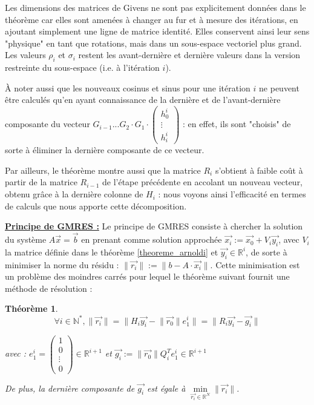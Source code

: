 \documentclass[11pt,a4paper,oneside]{memoir}
\newcommand{\R}{\mathbb{R}}	\newcommand{\Q}{\mathbb{Q}}	\newcommand{\C}{\mathbb{C}}
\newcommand{\N}{\mathbb{N}}	\newcommand{\Z}{\mathbb{Z}}
\theoremstyle{definition}
\theoremstyle{remark}
\theoremstyle{plain}
\newtheorem{theorem}{{Théorème}}
\begin{document}
Les dimensions des matrices de Givens ne sont pas explicitement données dans le théorème car elles sont amenées à changer au fur et à mesure des itérations, en ajoutant simplement une ligne de matrice identité. Elles conservent ainsi leur sens "physique" en tant que rotations, mais dans un sous-espace vectoriel plus grand. Les valeurs $\rho_i$ et $\sigma_i$ restent les avant-dernière et dernière valeurs dans la version restreinte du sous-espace (i.e. à l'itération $i$).

\`A noter aussi que les nouveaux cosinus et sinus pour une itération $i$ ne peuvent être calculés qu'en ayant connaissance de la dernière et de l'avant-dernière composante du vecteur $G_{i-1} ... G_2 \cdot G_1 \cdot \left( \begin{matrix}
h_0^i \\
\vdots \\
h_i^i
\end{matrix} \right)$ : en effet, ils sont "choisis" de sorte à éliminer la dernière composante de ce vecteur.

Par ailleurs, le théorème montre aussi que la matrice $R_i$ s'obtient à faible coût à partir de la matrice $R_{i-1}$ de l'étape précédente en accolant un nouveau vecteur, obtenu grâce à la dernière colonne de $H_i$ : nous voyons ainsi l'efficacité en termes de calculs que nous apporte cette décomposition.\bigskip

\underline{\textbf{Principe de GMRES :}}
Le principe de GMRES consiste à chercher la solution du système $A\vec{x} = \vec{b}$ en prenant comme solution approchée $\vec{x_i} := \vec{x_0} + V_i \vec{y_i}$, avec $V_i$ la matrice définie dans le théorème \ref{theoreme_arnoldi} et $\vec{y_i} \in \R^i$, de sorte à minimiser la norme du résidu : $\lVert \vec{r_i} \rVert := \lVert b - A \cdot \vec{x_i} \rVert$. Cette minimisation est un problème des moindres carrés pour lequel le théorème suivant fournit une méthode de résolution :

\begin{theorem}
\[
\forall i \in \N^*, \lVert \vec{r_i} \rVert = \lVert H_i \vec{y_i} - \lVert \vec{r_0} \rVert e_1^i \rVert = \lVert R_i \vec{y_i} - \vec{g_i} \rVert
\]

avec : $e_1^i = \left( \begin{matrix}
1\\
0\\
\vdots\\
0
\end{matrix} \right) \in \R^{i+1}$ et $\vec{g_i} := \lVert \vec{r_0} \rVert Q_i^T e_1^i \in \R^{i+1}$

De plus, la dernière composante de $\vec{g_i}$ est égale à $\underset{\vec{r_i} \in \R^N}{\min} \lVert \vec{r_i} \rVert$.
\end{theorem}
\end{document}
